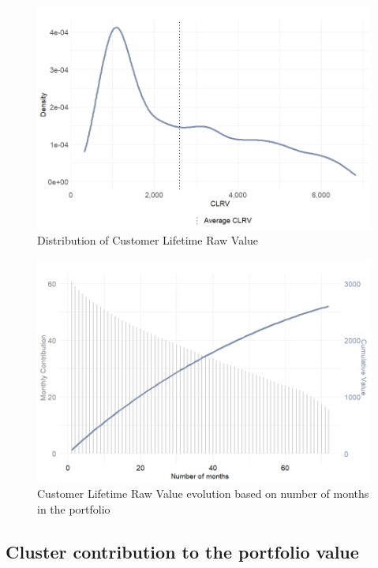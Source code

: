 \documentclass[
]{book}
\begin{document}
\begin{figure}

{\centering \includegraphics[width=12.5in]{./imgs/clrv_density} 

}

\caption{Distribution of Customer Lifetime Raw Value}\label{fig:clrvDens}
\end{figure}

\begin{figure}

{\centering \includegraphics[width=12.5in]{./imgs/clrv_evolution} 

}

\caption{Customer Lifetime Raw Value evolution based on number of months in the portfolio}\label{fig:clrvEvolution}
\end{figure}

\hypertarget{cluster-contribution-to-the-portfolio-value}{%
\subsection{Cluster contribution to the portfolio value}\label{cluster-contribution-to-the-portfolio-value}}
\end{document}

